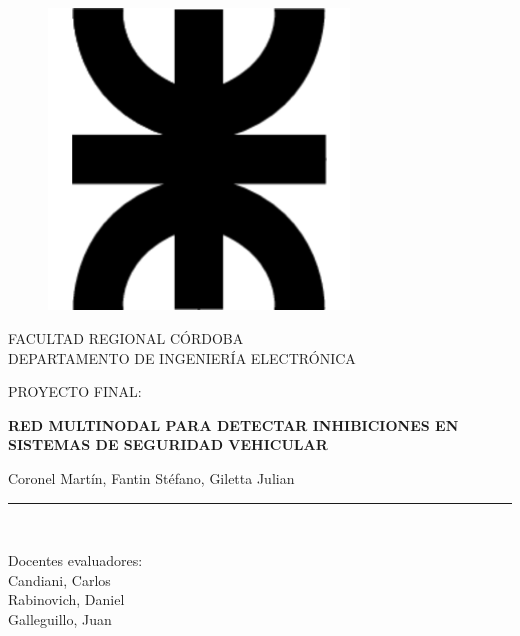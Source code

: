 \documentclass[12pt]{report}
\begin{document}
\begin{titlepage}

    \begin{center}
    \vspace*{-1in}
    \begin{figure}[htb]
    \begin{center}
    \includegraphics[width=8cm]{images/LogoUTN.png}
    \end{center}
    \end{figure}
    
    FACULTAD REGIONAL CÓRDOBA\\
    \vspace*{0.15in}
    DEPARTAMENTO DE INGENIERÍA ELECTRÓNICA \\
    \vspace*{0.6in}
    \begin{large}
    PROYECTO FINAL:\\
    \end{large}
    \vspace*{0.2in}
    \begin{Large}
    \textbf{RED MULTINODAL PARA DETECTAR INHIBICIONES EN SISTEMAS DE SEGURIDAD VEHICULAR} \\
    \end{Large}
    \vspace*{0.3in}
    \begin{large}
    Coronel Martín, Fantin Stéfano, Giletta Julian\\
    \end{large}
    \vspace*{0.3in}
    \rule{80mm}{0.1mm}\\
    \vspace*{0.1in}
    \begin{large}
    Docentes evaluadores: \\
    Candiani, Carlos\\
    Rabinovich, Daniel\\
    Galleguillo, Juan\\
    \end{large}
    \end{center}
    
\end{titlepage}
\end{document}

